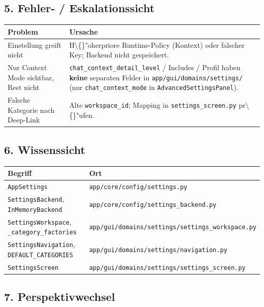 \subsection{5. Fehler- / Eskalationssicht}

\begin{center}
\begin{tabular}{ll}
\hline
Problem & Ursache \\
\hline
Einstellung greift nicht & H\textbackslash\{\}"oherpriore Runtime-Policy (Kontext) oder falscher Key; Backend nicht gespeichert. \\
Nur Context Mode sichtbar, Rest nicht & \texttt{chat\_context\_detail\_level} / Includes / Profil haben \textbf{keine} separaten Felder in \texttt{app/gui/domains/settings/} (nur \texttt{chat\_context\_mode} in \texttt{AdvancedSettingsPanel}). \\
Falsche Kategorie nach Deep-Link & Alte \texttt{workspace\_id}; Mapping in \texttt{settings\_screen.py} pr\textbackslash\{\}"ufen. \\
\hline
\end{tabular}
\end{center}

\subsection{6. Wissenssicht}

\begin{center}
\begin{tabular}{ll}
\hline
Begriff & Ort \\
\hline
\texttt{AppSettings} & \texttt{app/core/config/settings.py} \\
\texttt{SettingsBackend}, \texttt{InMemoryBackend} & \texttt{app/core/config/settings\_backend.py} \\
\texttt{SettingsWorkspace}, \texttt{\_category\_factories} & \texttt{app/gui/domains/settings/settings\_workspace.py} \\
\texttt{SettingsNavigation}, \texttt{DEFAULT\_CATEGORIES} & \texttt{app/gui/domains/settings/navigation.py} \\
\texttt{SettingsScreen} & \texttt{app/gui/domains/settings/settings\_screen.py} \\
\hline
\end{tabular}
\end{center}

\subsection{7. Perspektivwechsel}

